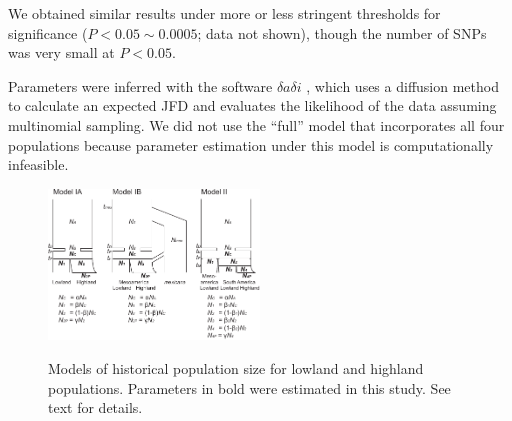 We obtained similar results under more or less stringent thresholds for significance ($P < 0.05 \sim 0.0005$; data not shown), though the number of SNPs was very small at $P<0.05$.  

Parameters were inferred with the software $\delta a \delta i$ \cite[]{Gutenkunst_2009_19851460}, which uses a diffusion method to calculate an expected JFD and evaluates the likelihood of the data assuming multinomial sampling. We did not use the ``full'' model that incorporates all four populations because parameter estimation under this model is computationally infeasible.

\begin{figure}[tb]   
  \begin{center}
   \vspace{-0mm}
   \includegraphics[width=0.5\textwidth]{fig/Fig3}
   \renewcommand{\baselinestretch}{0.9}
   \vspace{-3mm}
   \caption{  Models of historical population size for lowland and highland populations.  Parameters in bold were estimated in this study.  See text for details.
   }
\vspace{-6mm}
    \label{model}
  \end{center}
\end{figure}

